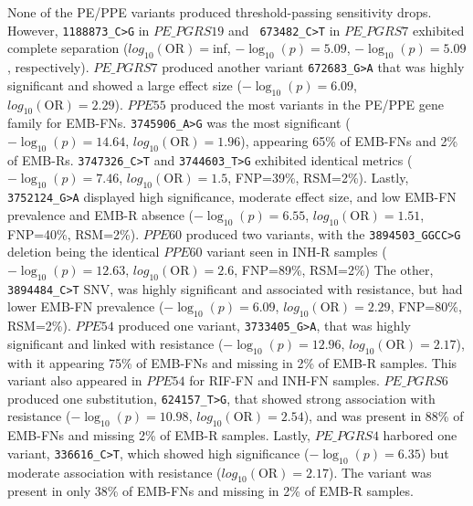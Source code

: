 None of the PE/PPE variants produced threshold-passing sensitivity drops. However, \texttt{1188873\_C>G} in $PE\_PGRS19$ and \texttt{ 673482\_C>T} in $PE\_PGRS7$ exhibited complete separation ($log_{10}(\text{OR})=$inf, $-\log_{10}(p)=5.09$, $-\log_{10}(p)=5.09$, respectively). $PE\_PGRS7$ produced another variant \texttt{672683\_G>A} that was highly significant and showed a large effect size ($-\log_{10}(p)=6.09$, $log_{10}(\text{OR})=2.29$). $PPE55$ produced the most variants in the PE/PPE gene family for EMB-FNs. \texttt{3745906\_A>G} was the most significant ($-\log_{10}(p)=14.64$, $log_{10}(\text{OR})=1.96$), appearing 65\% of EMB-FNs and 2\% of EMB-Rs. \texttt{3747326\_C>T} and \texttt{3744603\_T>G} exhibited identical metrics ($-\log_{10}(p)=7.46$, $log_{10}(\text{OR})=1.5$, FNP=39\%, RSM=2\%). Lastly, \texttt{3752124\_G>A} displayed high significance, moderate effect size, and low EMB-FN prevalence and EMB-R absence ($-\log_{10}(p)=6.55$, $log_{10}(\text{OR})=1.51$, FNP=40\%, RSM=2\%). $PPE60$ produced two variants, with the \texttt{3894503\_GGCC>G} deletion being the identical $PPE60$ variant seen in INH-R samples ($-\log_{10}(p)=12.63$, $log_{10}(\text{OR})=2.6$, FNP=89\%, RSM=2\%) The other, \texttt{3894484\_C>T} SNV, was highly significant and associated with resistance, but had lower EMB-FN prevalence ($-\log_{10}(p)=6.09$, $log_{10}(\text{OR})=2.29$, FNP=80\%, RSM=2\%). $PPE54$ produced one variant, \texttt{3733405\_G>A}, that was highly significant and linked with resistance ($-\log_{10}(p)=12.96$, $log_{10}(\text{OR})=2.17$), with it appearing 75\% of EMB-FNs and missing in 2\% of EMB-R samples. This variant also appeared in $PPE54$ for RIF-FN and INH-FN samples. $PE\_PGRS6$ produced one substitution, \texttt{624157\_T>G}, that showed strong association with resistance ($-\log_{10}(p)=10.98$, $log_{10}(\text{OR})=2.54$), and was present in 88\% of EMB-FNs and missing 2\% of EMB-R samples. Lastly, $PE\_PGRS4$ harbored one variant, \texttt{336616\_C>T}, which showed high significance ($-\log_{10}(p)=6.35$) but moderate association with resistance ($log_{10}(\text{OR})=2.17$). The variant was present in only 38\% of EMB-FNs and missing in 2\% of EMB-R samples. 

